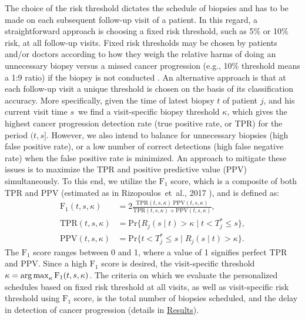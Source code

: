 The choice of the risk threshold dictates the schedule of biopsies and has to be made on each subsequent follow-up visit of a patient. In this regard, a straightforward approach is choosing a fixed risk threshold, such as 5\% or 10\% risk, at all follow-up visits. Fixed risk thresholds may be chosen by patients and/or doctors according to how they weigh the relative harms of doing an unnecessary biopsy versus a missed cancer progression (e.g., 10\% threshold means a 1:9 ratio) if the biopsy is not conducted \cite{vickers2006decision}. An alternative approach is that at each follow-up visit a unique threshold is chosen on the basis of its classification accuracy. More specifically, given the time of latest biopsy $t$ of patient $j$, and his current visit time $s$\, we find a visit-specific biopsy threshold $\kappa$, which gives the highest cancer progression detection rate (true positive rate, or TPR) for the period $(t, s]$. However, we also intend to balance for unnecessary biopsies (high false positive rate), or a low number of correct detections (high false negative rate) when the false positive rate is minimized. An approach to mitigate these issues is to maximize the TPR and positive predictive value (PPV) simultaneously. To this end, we utilize the $\mbox{F}_1$ score, which is a composite of both TPR and PPV (estimated as in Rizopoulos~et~al., 2017 \cite{landmarking2017}), and is defined as: 
\begin{equation}
\label{eq:F1_TPR_PPV}
\begin{split}
\mbox{F}_1(t,  s, \kappa) &= 2\frac{\mbox{TPR}(t,  s, \kappa)\ \mbox{PPV}(t,  s, \kappa)}{\mbox{TPR}(t,  s, \kappa) + \mbox{PPV}(t,  s, \kappa)},\\
\mbox{TPR}(t,  s, \kappa) &= \mbox{Pr}\big\{R_j(s \mid t) > \kappa \mid t < T^*_j \leq s\big\},\\
\mbox{PPV}(t,  s, \kappa) &= \mbox{Pr}\big\{t < T^*_j \leq s \mid R_j(s \mid t) > \kappa \big\}.
\end{split}
\end{equation}
The $\mbox{F}_1$ score ranges between 0 and 1, where a value of 1 signifies perfect TPR and PPV. Since a high $\mbox{F}_1$ score is desired, the visit-specific threshold ${\kappa=\operatorname{arg\,max}_{\kappa} \mbox{F}_1(t, s, \kappa)}$. The criteria on which we evaluate the personalized schedules based on fixed risk threshold at all visits, as well as visit-specific risk threshold using $\mbox{F}_1$ score, is the total number of biopsies scheduled, and the delay in detection of cancer progression (details in \hyperref[sec:results]{Results}). 